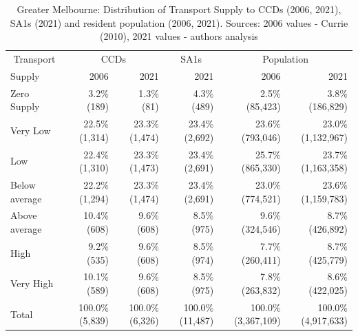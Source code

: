 \documentclass[preprint, 3p,
authoryear]{elsarticle} %
\begin{document}
\begin{table}

\caption{\label{tab:Greater_Melbourne_SA1_2021_table}Greater Melbourne: Distribution of Transport Supply to CCDs (2006, 2021),  SA1s (2021) and resident population (2006, 2021). Sources: 2006 values - Currie (2010), 2021 values - authors analysis}
\centering
\begin{tabular}[t]{l|r|r|r|r|r}
\hline
\multicolumn{1}{c|}{Transport} & \multicolumn{2}{c|}{CCDs} & \multicolumn{1}{c|}{SA1s} & \multicolumn{2}{c}{Population} \\
\cline{1-1} \cline{2-3} \cline{4-4} \cline{5-6}
Supply & 2006 & 2021 & 2021 & 2006 & 2021\\
\hline
Zero Supply & 3.2\%   (189) & 1.3\%    (81) & 4.3\%    (489) & 2.5\%    (85,423) & 3.8\%   (186,829)\\
\hline
Very Low & 22.5\% (1,314) & 23.3\% (1,474) & 23.4\%  (2,692) & 23.6\%   (793,046) & 23.0\% (1,132,967)\\
\hline
Low & 22.4\% (1,310) & 23.3\% (1,473) & 23.4\%  (2,691) & 25.7\%   (865,330) & 23.7\% (1,163,358)\\
\hline
Below average & 22.2\% (1,294) & 23.3\% (1,474) & 23.4\%  (2,691) & 23.0\%   (774,521) & 23.6\% (1,159,783)\\
\hline
Above average & 10.4\%   (608) & 9.6\%   (608) & 8.5\%    (975) & 9.6\%   (324,546) & 8.7\%   (426,892)\\
\hline
High & 9.2\%   (535) & 9.6\%   (608) & 8.5\%    (974) & 7.7\%   (260,411) & 8.7\%   (425,779)\\
\hline
Very High & 10.1\%   (589) & 9.6\%   (608) & 8.5\%    (975) & 7.8\%   (263,832) & 8.6\%   (422,025)\\
\hline
Total & 100.0\% (5,839) & 100.0\% (6,326) & 100.0\% (11,487) & 100.0\% (3,367,109) & 100.0\% (4,917,633)\\
\hline
\end{tabular}
\end{table}
\end{document}
